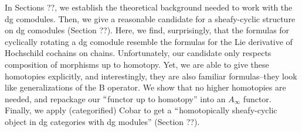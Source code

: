 \documentclass[12pt]{article} %
\begin{document}
In Sections ??, we establish the theoretical background needed to work with the dg comodules. Then, we give a reasonable candidate for a sheafy-cyclic structure on dg comodules (Section ??). Here, we find, surprisingly, that the formulas for cyclically rotating a dg comodule resemble the formulas for the Lie derivative of Hochschild cochains on chains. Unfortunately, our candidate only respects composition of morphisms up to homotopy. Yet, we are able to give these homotopies explicitly, and interestingly, they are also familiar formulas--they look like generalizations of the B operator. We show that no higher homotopies are needed, and repackage our $``$functor up to homotopy'' into an $A_\infty$ functor. Finally, we apply (categorified) Cobar to get a $``$homotopically sheafy-cyclic object in dg categories with dg modules'' (Section ??).
\end{document}
